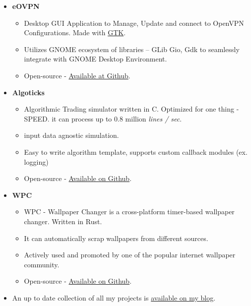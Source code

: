 \documentclass{article}
\begin{document}
\begin{itemize}
    
    \item \textbf{eOVPN}
    \subitem
    \begin{itemize}
        \vspace{-0.25cm}
        \item Desktop GUI Application to Manage, Update and connect to OpenVPN Configurations. Made with \href{https://gtk.org/}{GTK}.
        \item Utilizes GNOME ecosystem of libraries -- GLib Gio, Gdk to seamlessly integrate with GNOME Desktop Environment.
        \item Open-source - \href{https://github.com/jkotra/eOVPN}{Available at Github}.
        \vspace{0.35cm}
    \end{itemize}
    

    \item \textbf{Algoticks}
    \subitem
    \begin{itemize}
        \vspace{-0.25cm}
        \item Algorithmic Trading simulator written in C. Optimized for one thing - SPEED. it can process up to 0.8 million \textit{lines / sec}.
        \item input data agnostic simulation.
        \item Easy to write algorithm template, supports custom callback modules (ex. logging)
        \item Open-source - \href{https://github.com/jkotra/algoticks/}{Available on Github}.
        \vspace{0.35cm}
    \end{itemize}
    
    \pagebreak
    
    \item \textbf{WPC}
    \subitem
    \begin{itemize}
        \vspace{-0.25cm}
        \item WPC - Wallpaper Changer is a cross-platform timer-based wallpaper changer. Written in Rust.
        \item It can automatically scrap wallpapers from different sources.
        \item Actively used and promoted by one of the popular internet wallpaper community.
        \item Open-source - \href{https://github.com/jkotra/wpc/}{Available on Github}.
        \vspace{0.35cm}
    \end{itemize}
    
    \item An up to date collection of all my projects is \href{https://stdin.top/portfolio/}{available on my blog}.                  
\end{itemize}
\end{document}
